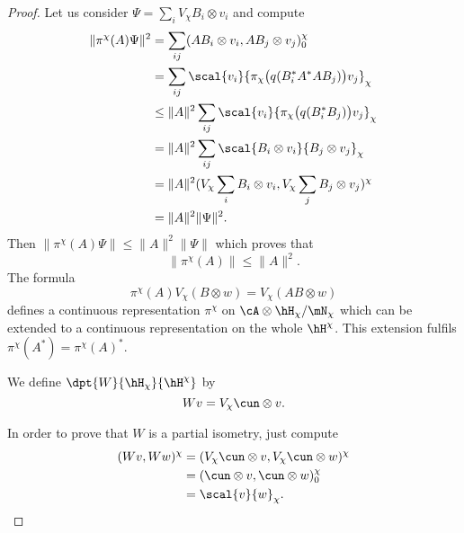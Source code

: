 \begin{proof}
Let us consider $\Psi=\sum_iV_{\chi}B_i\otimes v_i$ and compute
\begin{equation}
\begin{split}
\| \pi^{\chi}(A)\Psi \|^2&=\sum_{ij}( AB_i\otimes v_i , AB_j\otimes v_j )_0^{\chi}\\
        &=\sum_{ij}\scal{ v_i }{ \pi_{\chi}\big( q(B_i^*A^*AB_j) \big)v_j }_{\chi}\\
        &\leq \| A \|^2\sum_{ij}\scal{ v_i }{ \pi_{\chi}\big( q(B^*_iB_j) \big)v_j }_{\chi}\\
        &=\| A \|^2\sum_{ij}\scal{ B_i\otimes v_i }{ B_j\otimes v_j }_{\chi}\\
        &=\| A \|^2( V_{\chi}\sum_i B_i\otimes v_i , V_{\chi}\sum_jB_j\otimes v_j )^{\chi}\\
        &=\| A \|^2\| \Psi \|^2.
\end{split}
\end{equation}
Then $\| \pi^{\chi}(A)\Psi \|\leq \| A \|^2\| \Psi \|$ which proves that
\begin{equation}
\| \pi^{\chi}(A) \|\leq\| A \|^2.
\end{equation}
The formula
\begin{equation}
  \pi^{\chi}(A)V_{\chi}(B\otimes w)=V_{\chi}(AB\otimes w)
\end{equation}
defines a continuous representation $\pi^{\chi}$ on $\cA\otimes\hH_{\chi}/\mN_{\chi}$ which can be extended to a continuous representation on the whole $\hH^{\chi}$. This extension fulfils $\pi^{\chi}(A^*)=\pi^{\chi}(A)^*$.

We define $\dpt{ W }{ \hH_{\chi} }{ \hH^{\chi} }$ by
\begin{equation}
  Wv=V_{\chi}\cun\otimes v.
\end{equation}


In order to prove that $W$ is a partial isometry, just compute
\begin{equation}
\begin{split}
( Wv , Ww )^{\chi}&=( V_{\chi}\cun\otimes v , V_{\chi}\cun\otimes w )^{\chi}\\
        &=( \cun\otimes v , \cun\otimes w )_0^{\chi}\\
        &=\scal{ v }{ w }_{\chi}.
\end{split}
\end{equation}



\end{proof}
